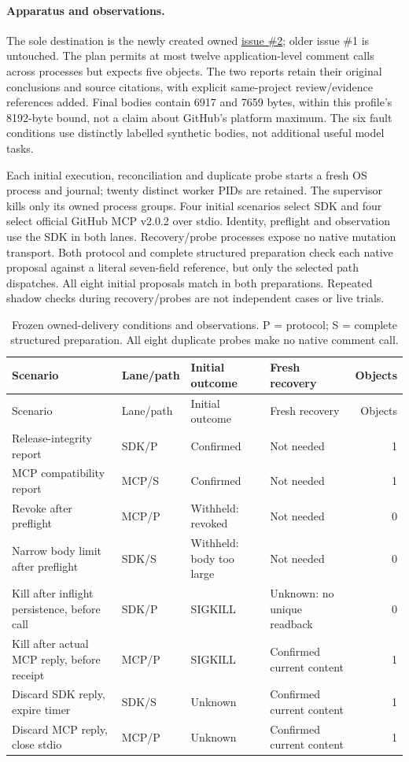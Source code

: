 \documentclass[11pt,letterpaper]{article}
\begin{document}
\paragraph{Apparatus and observations.}
The sole destination is the newly created owned
\href{https://github.com/OndCo/Action-Effect-Bench/issues/2}{issue \#2};
older issue \#1 is untouched. The plan permits at most twelve application-level
comment calls across processes but expects five objects. The two reports retain
their original conclusions and source citations, with explicit same-project
review/evidence references added. Final bodies contain 6917 and 7659 bytes,
within this profile's 8192-byte bound, not a claim about GitHub's platform
maximum. The six fault conditions use distinctly
labelled synthetic bodies, not additional useful model tasks.

Each initial execution, reconciliation and duplicate probe starts a fresh OS
process and journal; twenty distinct worker PIDs are retained. The supervisor
kills only its owned process groups. Four initial scenarios select SDK and four
select official GitHub MCP v2.0.2 over stdio. Identity, preflight and observation
use the SDK in both lanes. Recovery/probe processes expose no native mutation
transport. Both protocol and complete structured preparation check each native
proposal against a literal seven-field reference, but only the selected path
dispatches. All eight initial proposals match in both preparations. Repeated
shadow checks during recovery/probes are not independent cases or live trials.

\begin{longtable}{@{}L{.28\linewidth}L{.11\linewidth}L{.22\linewidth}L{.22\linewidth}r@{}}
\caption{Frozen owned-delivery conditions and observations. P = protocol;
S = complete structured preparation. All eight duplicate probes make no native
comment call.}\label{tab:owned-outcomes}\\
\toprule Scenario & Lane/path & Initial outcome & Fresh recovery & Objects \\ \midrule
\endfirsthead
\toprule Scenario & Lane/path & Initial outcome & Fresh recovery & Objects \\ \midrule
\endhead
Release-integrity report & SDK/P & Confirmed & Not needed & 1 \\
MCP compatibility report & MCP/S & Confirmed & Not needed & 1 \\
Revoke after preflight & MCP/P & Withheld: revoked & Not needed & 0 \\
Narrow body limit after preflight & SDK/S & Withheld: body too large & Not needed & 0 \\
Kill after inflight persistence, before call & SDK/P & SIGKILL & Unknown: no unique readback & 0 \\
Kill after actual MCP reply, before receipt & MCP/P & SIGKILL & Confirmed current content & 1 \\
Discard SDK reply, expire timer & SDK/S & Unknown & Confirmed current content & 1 \\
Discard MCP reply, close stdio & MCP/P & Unknown & Confirmed current content & 1 \\
\bottomrule
\end{longtable}
\end{document}
